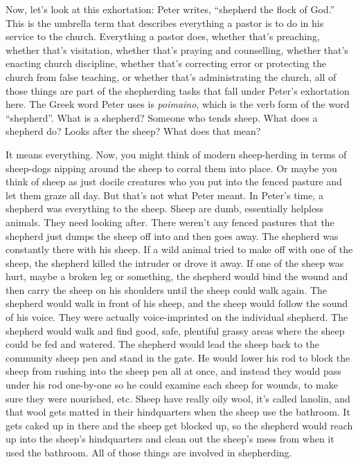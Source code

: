 \documentclass[letterpaper, 12pt]{article}
\begin{document}
    Now, let's look at this exhortation: Peter writes, ``shepherd the
    flock of God.'' This is the umbrella term that describes everything
    a pastor is to do in his service to the church. Everything a pastor
    does, whether that's preaching, whether that's visitation, whether
    that's praying and counselling, whether that's enacting church
    discipline, whether that's correcting error or protecting the church
    from false teaching, or whether that's administrating the
    church, all of those things are part of the shepherding tasks that
    fall under Peter's exhortation here. The Greek word Peter uses is
    \emph{poimaino}, which is the verb form of the word ``shepherd''.
    What is a shepherd? Someone who tends sheep. What does a shepherd
    do? Looks after the sheep? What does that mean?

    It means everything. Now, you might think of modern sheep-herding in
    terms of sheep-dogs nipping around the sheep to corral them into
    place. Or maybe you think of sheep as just docile creatures who you
    put into the fenced pasture and let them graze all day. But that's
    not what Peter meant. In Peter's time, a shepherd was everything to
    the sheep. Sheep are dumb, essentially helpless animals. They need
    looking after. There weren't any fenced pastures that the shepherd
    just dumps the sheep off into and then goes away. The shepherd was
    constantly there with his sheep. If a wild animal tried to make off
    with one of the sheep, the shepherd killed the intruder or drove it
    away. If one of the sheep was hurt, maybe a broken leg or something,
    the shepherd would bind the wound and then carry the sheep on his
    shoulders until the sheep could walk again. The shepherd would walk
    in front of his sheep, and the sheep would follow the sound of his
    voice. They were actually voice-imprinted on the individual
    shepherd. The shepherd would walk and find good, safe, plentiful
    grassy areas where the sheep could be fed and watered. The shepherd
    would lead the sheep back to the community sheep pen and stand in
    the gate. He would lower his rod to block the sheep from rushing
    into the sheep pen all at once, and instead they would pass under
    his rod one-by-one so he could examine each sheep for wounds, to
    make sure they were nourished, etc. Sheep have really oily wool,
    it's called lanolin, and that wool gets matted in their hindquarters
    when the sheep use the bathroom. It gets caked up in there and the
    sheep get blocked up, so the shepherd would reach up into the
    sheep's hindquarters and clean out the sheep's mess from when it
    used the bathroom. All of those things are involved in shepherding.
\end{document}
